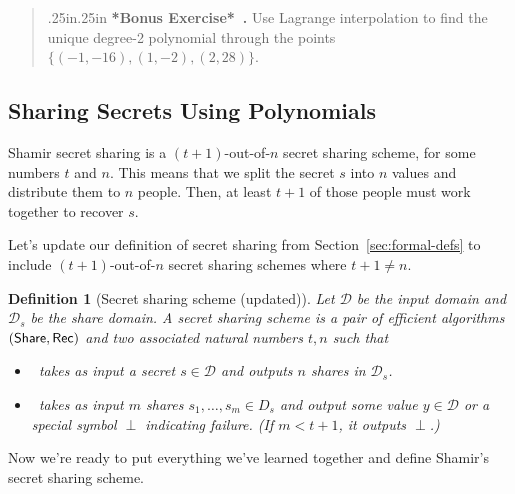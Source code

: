 \documentclass[12 pt]{article}
\newtheorem{definition}{Definition}
\def\D{\ensuremath{\mathcal{D}}}
\newcounter{exercise}[section]
\newenvironment{bonus}{\refstepcounter{exercise}\par\bigskip \begin{quotation}{}{\leftmargin .25in\rightmargin .25in}
    \noindent \textbf{*Bonus Exercise*~\thesection.\theexercise }  \rmfamily}{\end{quotation}\par\bigskip}
\begin{document}
\begin{bonus}
    Use Lagrange interpolation to find the unique degree-2 
    polynomial through the points $\{(-1,-16),(1,-2),(2,28)\}$.
\end{bonus}

\subsection{Sharing Secrets Using Polynomials}


Shamir secret sharing is a $(t+1)$-out-of-$n$ secret sharing scheme, for some numbers $t$ and $n$. This means that we split the secret $s$ into $n$ values and distribute them to $n$ people. Then, at least $t+1$ of those people must work together to recover $s$.

Let's update our definition of secret sharing from Section~\ref{sec:formal-defs}
to include $(t+1)$-out-of-$n$ secret sharing schemes where $t+1 \neq n$.

\begin{definition}[Secret sharing scheme (updated)]\label{def:ss-update}
    Let $\D$ be the input domain and $\D_s$ be the share domain.
    A secret sharing scheme is a pair of efficient algorithms $(\mathsf{Share}, \mathsf{Rec})$
    and two associated natural numbers $t,n$ such that

    \begin{itemize}
        \item \share~takes as input a secret $s \in \D$ and outputs $n$ 
        shares in $\D_s$.
        \item \rec~takes as input $m$ shares $s_1, \ldots, s_m \in D_s$ 
        and output some value $y \in \D$ or a special symbol $\perp$ 
        indicating failure. (If $m < t+1$, it outputs $\perp$.)
    \end{itemize}
\end{definition}

Now we're ready to put everything we've learned together and define 
Shamir's secret sharing scheme\footnotemark.
\end{document}
